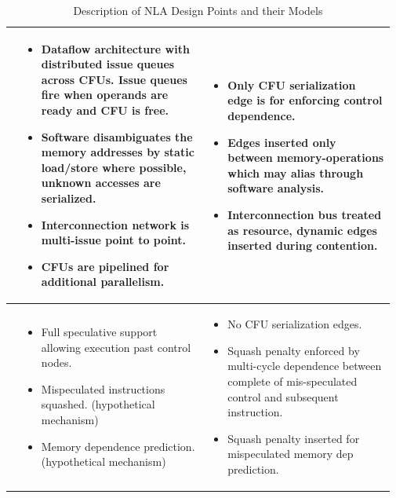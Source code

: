 \begin{table}[h]
\begin{adjustwidth}{-0.6in}{-0.6in}
\begin{center}
\begin{tabular}{m{0.01\linewidth}@{}m{0.48\linewidth}m{0.48\linewidth}}
\\ [-0.6\normalbaselineskip]  \midrule

 
\parbox[t]{1mm}{} 
& 
\begin{itemize}
  \item \textbf{} Dataflow architecture with distributed issue queues across CFUs.  Issue queues fire when operands are ready and CFU is free.
  \item \textbf{} Software disambiguates the memory addresses by static load/store where possible, unknown accesses are serialized.
  \item \textbf{} Interconnection network is multi-issue point to point.
  \item \textbf{} CFUs are pipelined for additional parallelism.
\end{itemize}

&
\begin{itemize}
\item \textbf{}Only CFU serialization edge is for enforcing control dependence.
\item \textbf{}Edges inserted only between memory-operations which may alias through
software analysis.
\item \textbf{}Interconnection bus treated as resource, dynamic edges inserted during
contention.
\end{itemize}
\\  [-0.6\normalbaselineskip] \midrule


\parbox[t]{1mm}{} 
&
  \begin{itemize}
  \item \textbf{}Full speculative support allowing execution past control
nodes.
  \item \textbf{}Mispeculated instructions squashed.  (hypothetical mechanism)
  \item \textbf{}Memory dependence prediction.  (hypothetical mechanism)
  \end{itemize}
&
  \begin{itemize}
  \item \textbf{}No CFU serialization edges.
  \item \textbf{}Squash penalty enforced by multi-cycle dependence between complete of mis-speculated control and subsequent instruction.
  \item \textbf{}Squash penalty inserted for mispeculated memory dep prediction.
  \end{itemize}
 
\\ [-0.6\normalbaselineskip]  \bottomrule 

\end{tabular}

\caption{Description of NLA Design Points and their Models}
\label{tab:nlatrans}  
\end{center}
\vspace{-0.15in}
\end{adjustwidth}

\end{table}


